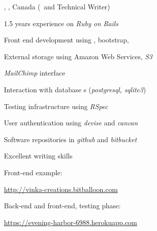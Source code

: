 \textbf{\large \current}

{\jobt{\consultant}, \nameMontreal, Canada (\webdev\ and Technical
Writer)

\begin{list}{} {\leftmargin=-1cm \itemsep-3pt} 
\vspace*{-0.2cm}
\item 1.5 years experience on \textit{Ruby on Rails}
\item Front end development using , bootstrap, 
\item External storage using Amazon Web Services, \textit{S3}
\item \textit{MailChimp} interface
\item Interaction with database s (\textit{postgresql, sqlite3})
\item Testing infrastructure using \textit{RSpec}
\item User authentication using \textit{devise} and \textit{cancan}
\item Software repositories in \textit{github} and \textit{bitbucket}
\item Excellent writing skills

Front-end example:
   \begin{list}{} {\leftmargin=0.5cm \itemsep-1pt} 
     \vspace*{-0.2cm}
     \item
     \href{http://vinka-creations.bitballoon.com}%
       {\footnotesize{\url{http://vinka-creations.bitballoon.com}}}
   \end{list}
Back-end and front-end, testing phase:
   \begin{list}{} {\leftmargin=0.5cm \itemsep-1pt} 
     \vspace*{-0.2cm}
     \item
     \href{https://evening-harbor-6988.herokuapp.com}%
       {\footnotesize{\url{https://evening-harbor-6988.herokuapp.com}}}
   \end{list}
\end{list}



\iffalse
\vspace*{-0.3cm}
   \begin{list}{\labelitemii} {\leftmargin=0.5cm \itemsep-1pt} 

   \item \webdevA.
     {\footnotesize{\url{https://evening-harbor-6988.herokuapp.com}}}
   \item \webdevB:\\
   \href{http://vinka-creations.bitballoon.com}%
     {\footnotesize{\url{http://vinka-creations.bitballoon.com}}}\\
   \end{list}

\vspace*{-0.2cm}
\item \nameWriter: \writerDesc.
\fi

}
